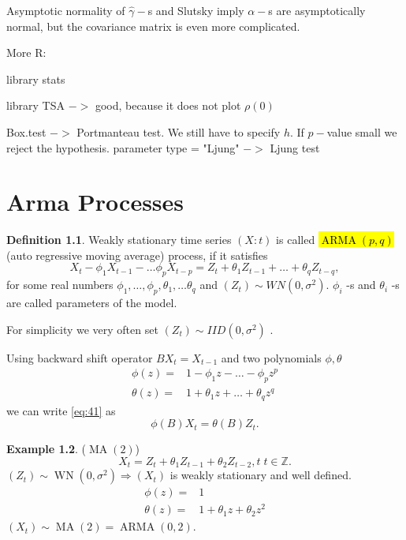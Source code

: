 \documentclass[12pt,a4paper, notitlepage]{book}
\newcommand{\hlc}[2][yellow]{ {\sethlcolor{#1} \hl{#2}} }
\newcommand{\hlcr}[1]{\hlc[lightred]{#1}}
\theoremstyle{definition} %
\newtheorem{definition}{Definition}[section]
\newtheorem{example}[definition]{Example}
\theoremstyle{plain} %
\newcommand{\Z}{\mathbb Z}
\DeclareMathOperator{\Wn}{WN}
\DeclareMathOperator{\Arma}{ARMA}
\DeclareMathOperator{\Ma}{MA}
\newcommand{\New}[1]{ {\bf \hlcr{#1} } }
\begin{document}
Asymptotic normality of $\hat{\gamma}-$s and Slutsky imply $\alpha -$s are asymptotically normal, but the covariance matrix is even more complicated.  

\vskip1cm

More R:

library stats

library TSA $->$ good, because it does not plot $\rho(0)$

Box.test $->$ Portmanteau test. We still have to specify $h$. If $p-$value small we reject the hypothesis.
parameter type = "Ljung" $->$ Ljung test






\chapter{Arma Processes}

\begin{definition}
Weakly stationary time series $ (X:t) $ is called \New{$ \Arma(p,q)$} (auto regressive moving average) process, if it 
satisfies 
\[ X_t - \phi _1 X_{t-1} - \ldots \phi _p X_{t-p} = Z_t + \theta _1 Z_{t-1} + \ldots + \theta _q Z_{t-q}  , \label{eq:41} \]
for some real numbers $ \phi _1, \ldots , \phi _p, \theta _1, \ldots \theta _q $ and $ (Z_t) \sim WN(0, \sigma ^2) $. 
$ \phi _i$ -s and $ \theta _i $ -s are called parameters of the model.
\end{definition}

For simplicity we very often set $ (Z_t) \sim IID(0, \sigma ^2) $ .

Using backward shift operator $ B X_t = X_{t-1} $ and two polynomials $ \phi , \theta $
\begin{align*}
\phi(z) = & 1 - \phi _1 z - \ldots - \phi _p z^p \\
\theta (z) = & 1 + \theta _1 z + \ldots + \theta_q z^q \end{align*}
we can write \ref{eq:41} as 
\[ \phi (B) X_t = \theta(B) Z_t . \]

\begin{example} ($\Ma(2) $)
\[ X_t = Z_t + \theta_1 Z_{t-1} + \theta_2 Z_{t-2} , t\; t \in \Z . \]
$(Z_t) \sim \Wn(0, \sigma ^2) \Rightarrow (X_t) $ is weakly stationary and well defined.
\begin{align*} 
\phi(z) = & 1 \\
\theta (z) = & 1 + \theta _1 z + \theta_2 z^2 
\end{align*}
$ (X_t) \sim \Ma(2) = \Arma(0,2) $.
\end{example}
\end{document}
